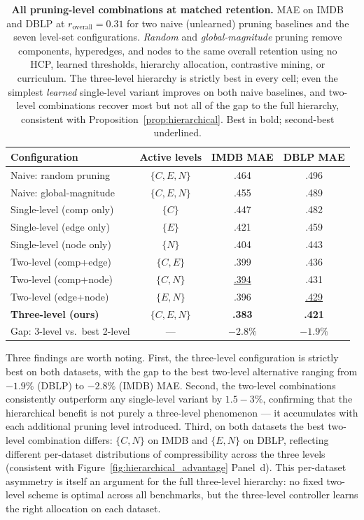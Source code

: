 \documentclass[10pt]{article}
\theoremstyle{plain}
\theoremstyle{definition}
\begin{document}
\begin{table}[ht!]
\centering
\caption{\textbf{All pruning-level combinations at matched retention.} MAE on IMDB and DBLP at $r_{\mathrm{overall}}\!=\!0.31$ for two naive (unlearned) pruning baselines and the seven level-set configurations. \emph{Random} and \emph{global-magnitude} pruning remove components, hyperedges, and nodes to the same overall retention using no HCP, learned thresholds, hierarchy allocation, contrastive mining, or curriculum. The three-level hierarchy is strictly best in every cell; even the simplest \emph{learned} single-level variant improves on both naive baselines, and two-level combinations recover most but not all of the gap to the full hierarchy, consistent with Proposition~\ref{prop:hierarchical}. Best in bold; second-best underlined.}
\label{tab:pruning_levels}
\setlength{\tabcolsep}{6pt}
\renewcommand{\arraystretch}{1.1}
\small
\begin{tabular}{l c cc}
\toprule
\textbf{Configuration} & \textbf{Active levels} & \textbf{IMDB MAE} & \textbf{DBLP MAE} \\
\midrule
Naive: random pruning      & $\{C,E,N\}$   & .464 & .496  \\
Naive: global-magnitude    & $\{C,E,N\}$   & .455 & .489 \\
\midrule
Single-level (comp only)   & $\{C\}$       & .447 & .482 \\   
Single-level (edge only)   & $\{E\}$       & .421 & .459 \\   
Single-level (node only)   & $\{N\}$       & .404 & .443 \\   
\midrule
Two-level (comp+edge)      & $\{C,E\}$     & .399 & .436 \\   
Two-level (comp+node)      & $\{C,N\}$     & \underline{.394} & .431 \\   
Two-level (edge+node)      & $\{E,N\}$     & .396 & \underline{.429} \\   
\midrule
\rowcolor{blue!10}
\textbf{Three-level (ours)} & $\{C,E,N\}$  & \textbf{.383} & \textbf{.421} \\
\midrule
Gap: 3-level vs.\ best 2-level & ---       & $-2.8\%$ & $-1.9\%$ \\
\bottomrule
\end{tabular}
\end{table}
 
Three findings are worth noting. First, the three-level configuration is strictly best on both datasets, with the gap to the best two-level alternative ranging from $-1.9\%$ (DBLP) to $-2.8\%$ (IMDB) MAE. Second, the two-level combinations consistently outperform any single-level variant by $1.5\!-\!3\%$, confirming that the hierarchical benefit is not purely a three-level phenomenon --- it accumulates with each additional pruning level introduced. Third, on both datasets the best two-level combination differs: $\{C,N\}$ on IMDB and $\{E,N\}$ on DBLP, reflecting different per-dataset distributions of compressibility across the three levels (consistent with Figure~\ref{fig:hierarchical_advantage} Panel~d). This per-dataset asymmetry is itself an argument for the full three-level hierarchy: no fixed two-level scheme is optimal across all benchmarks, but the three-level controller learns the right allocation on each dataset.
\end{document}
